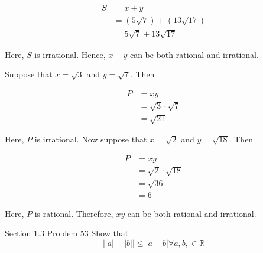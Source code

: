 \documentclass{article}
\begin{document}
        \begin{align*}
            S   &= x + y \\
                &= (5\sqrt{7}) + (13\sqrt{17}) \\
                &= 5\sqrt{7} + 13\sqrt{17}
        \end{align*}

        \noindent Here, $S$ is irrational. Hence, $x+y$ can be both rational and irrational.

        Suppose that $x=\sqrt{3}$ and $y=\sqrt{7}$. Then

        \begin{align*}
            P   &= xy \\
                &= \sqrt{3} \cdot \sqrt{7} \\
                &= \sqrt{21}
        \end{align*}

        \noindent Here, $P$ is irrational. Now suppose that $x=\sqrt{2}$ and $y=\sqrt{18}$. Then

        \begin{align*}
            P   &= xy \\
                &= \sqrt{2} \cdot \sqrt{18} \\
                &= \sqrt{36} \\
                &= 6
        \end{align*}

        \noindent Here, $P$ is rational. Therefore, $xy$ can be both rational and irrational.



    \thispagestyle{page3}

    \begin{tbhtheorem}{Section 1.3 Problem 53}
        Show that
        \[
            \big| |a| - |b|\big|\leq |a-b| \forall a,b,\in\mathbb{R}
        \]
    \end{tbhtheorem}
\end{document}

